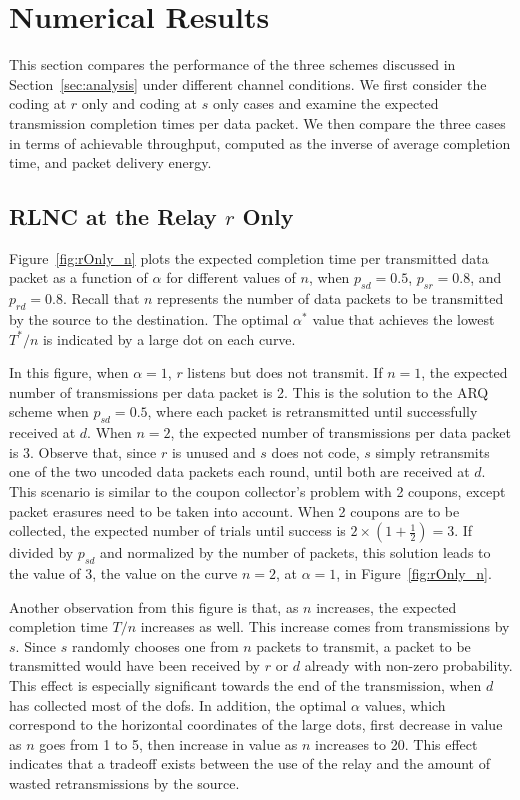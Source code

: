 \documentclass[journal, letterpaper]{IEEEtran}
\begin{document}
\section{Numerical Results}\label{sec:simulations}

This section compares the performance of the three schemes discussed in Section~\ref{sec:analysis} under different channel conditions. We first consider the coding at $r$ only and coding at $s$ only cases and examine the expected transmission completion times per data packet. We then compare the three cases in terms of achievable throughput, computed as the inverse of average completion time, and packet delivery energy.

\subsection{RLNC at the Relay $r$ Only}

Figure~\ref{fig:rOnly_n} plots the expected completion time per transmitted data packet as a function of $\alpha$ for different values of $n$, when $p_{sd}=0.5$, $p_{sr}=0.8$, and $p_{rd}=0.8$. Recall that $n$ represents the number of data packets to be transmitted by the source to the destination. The optimal $\alpha^*$ value that achieves the lowest $T^*/n$ is indicated by a large dot on each curve.

In this figure, when $\alpha = 1$, $r$ listens but does not transmit. If $n=1$, the expected number of transmissions per data packet is 2. This is the solution to the ARQ scheme when $p_{sd} = 0.5$, where each packet is retransmitted until successfully received at $d$. When $n=2$, the expected number of transmissions per data packet is 3. Observe that, since $r$ is unused and $s$ does not code, $s$ simply retransmits one of the two uncoded data packets each round, until both are received at $d$. This scenario is similar to the coupon collector's problem with 2 coupons, except packet erasures need to be taken into account. When 2 coupons are to be collected, the expected number of trials until success is $2\times(1+\frac12) =3$. If divided by $p_{sd}$ and normalized by the number of packets, this solution leads to the value of 3, the value on the curve $n=2$, at $\alpha=1$, in Figure~\ref{fig:rOnly_n}.

Another observation from this figure is that, as $n$ increases, the expected completion time $T/n$ increases as well. This increase comes from transmissions by $s$. Since $s$ randomly chooses one from $n$ packets to transmit, a packet to be transmitted would have been received by $r$ or $d$ already with non-zero probability. This effect is especially significant towards the end of the transmission, when $d$ has collected most of the dofs. In addition, the optimal $\alpha$ values, which correspond to the horizontal coordinates of the large dots, first decrease in value as $n$ goes from 1 to 5, then increase in value as $n$ increases to 20. This effect indicates that a tradeoff exists between the use of the relay and the amount of wasted retransmissions by the source.
\end{document}
